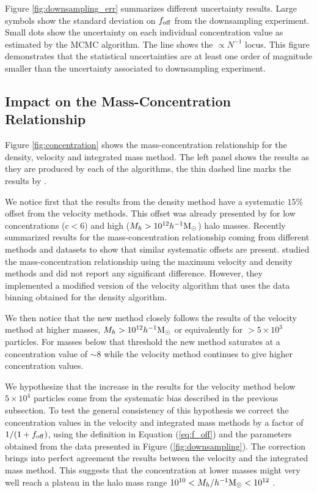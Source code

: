 \documentclass{emulateapj}
\newcommand{\hMsun}{{\ifmmode{h^{-1}{\rm {M_{\odot}}}}\else{$h^{-1}{\rm{M_{\odot}}}$}\fi}}
\begin{document}
Figure \ref{fig:downsampling_err} summarizes different uncertainty
results.  
Large symbols show the standard deviation on $f_{\rm off}$ from the
downsampling experiment.  
Small dots show the uncertainty on each individual concentration value
as estimated by the MCMC algorithm. 
The line shows the $\propto N^{-1}$ locus.  
This figure demonstrates that the statistical uncertainties are at
least one order of magnitude smaller than the uncertainty associated
to downsampling experiment. 


 
\subsection{Impact on the Mass-Concentration Relationship}


Figure \ref{fig:concentration} shows the mass-concentration
relationship for the density, velocity and integrated mass method.
The left panel shows the results as they are produced by each of the
algorithms, the thin dashed line marks the results by
\citep{Prada2012}.

We notice first that the results from the density method have a
systematic $15\%$offset from the velocity methods.  
This offset was already presented by \citep{Prada2012} for low
concentrations ($c<6$) and high ($M_h>10^{12}\hMsun$) halo masses.  
Recently \citep{Klypin2016} summarized results for the
mass-concentration relationship coming from different methods and
datasets to show that similar systematic offsets are present.
\citep{2014MNRAS.441.3359D} studied the mass-concentration
relationship using the maximum velocity and density methods and did
not report any significant difference. However, they implemented a
modified version of the velocity algorithm that uses the data binning
obtained for the density algorithm. 


We then notice that the new method closely follows the results of
the velocity method at higher masses, $M_h>10^{12}\hMsun$ or
equivalently for $>5\times10^3$ particles.  
For masses below that threshold the new method saturates at a
concentration value of $\sim 8$ while the velocity method continues to
give higher concentration values. 

We hypothesize that the increase in the results for the velocity
method below $5\times 10^{4}$ particles come from the systematic bias
described in the previous subsection.  To test the general consistency
of this hypothesis we correct the concentration values in the
velocity and integrated mass methods by a factor of $1/(1+f_{\rm
  off})$, using the definition in Equation (\ref{eq:f_off}) and the 
parameters obtained from the data presented in Figure
(\ref{fig:downsampling}).  
The correction brings into perfect agreement the results between the
velocity and the integrated mass method.  
This suggests that the concentration at lower masses might very well
reach a plateau in the halo mass range $10^{10}< M_{h}/\hMsun <
10^{12}$ . 
\end{document}
